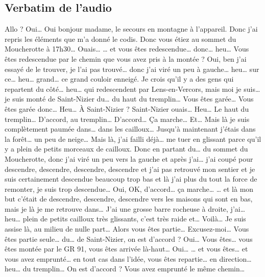 


\subsection{Verbatim de l'audio}


\begin{dialogue*}
  \Sec Allo ?
  \Req Oui…
  \Sec Oui bonjour madame, le secours en montagne à l'appareil. Donc
  j'ai repris les éléments que m'a donné le \ac{codis}. Donc vous
  étiez au sommet du Moucherotte à 17h30…
  \Req Ouais…
  \Sec … et vous êtes redescendue… donc… heu… Vous êtes redescendue
  par le chemin que vous avez pris à la montée ?
  \Req Oui, ben j'ai essayé de le trouver, je l'ai pas trouvé… donc
  j'ai viré un peu à gauche… heu… sur ce… heu… grand… ce grand couloir
  enneigé. Je crois qu'il y a des gens qui repartent du côté… heu…
  qui redescendent par Lens-en-Vercors, mais moi je suis… je suis
  monté de Saint-Nizier du… du haut du tremplin…
  \Sec Vous êtes garée… Vous êtes garée donc… Heu… À Saint-Nizier ?
  \Req Saint-Nizier ouais… Heu… Le haut du tremplin…
  \Sec D'accord, au tremplin… D'accord… Ça marche…
  \Req Et… Mais là je suis complètement paumée dans… dans les
  cailloux… Jusqu'à maintenant j’étais dans la forêt… un peu de neige…
  Mais là, j'ai failli déjà… me tuer en glissant parce qu’il y a plein
  de petits morceaux de cailloux. Donc en partant du… du sommet du
  Moucherotte, donc j'ai viré un peu vers la gauche et après j'ai…
  j'ai coupé pour descendre, descendre, descendre, descendre et j'ai
  pas retrouvé mon sentier et je suis certainement descendue beaucoup
  trop bas et là j'ai plus du tout la force de remonter, je suis trop
  descendue…
  \Sec {} Oui, OK, d'accord… ça marche…
  \Req … et là mon but c'était de descendre, descendre, descendre vers
  les maisons qui sont en bas, mais je là je me retrouve dans… J'ai
  une grosse barre rocheuse à droite, j'ai… heu… plein de petits
  cailloux très glissants, c'est très raide et… Voilà… Je suis assise
  là, au milieu de nulle part… 
  \Sec {} Alors vous êtes partie…
  Excusez-moi… Vous êtes partie seule… du… de Saint-Nizier, on est
  d'accord ?
  \Req Oui…
  \Sec Vous êtes… vous êtes montée par le GR 91, vous êtes arrivée
  là-haut…
  \Req {} Oui…
  \Sec … et vous êtes… et vous avez emprunté… en tout cas dans l'idée,
  vous êtes repartie… en direction… heu… du tremplin… On est d'accord
  ?  Vous avez emprunté le même chemin…

\end{dialogue*}
